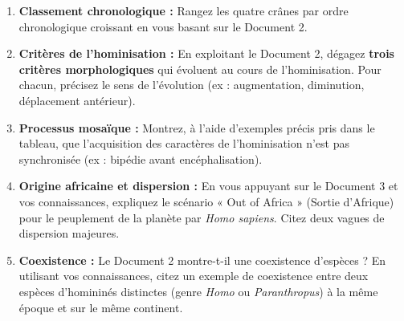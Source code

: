 \documentclass[11pt]{article}
\begin{document}
\begin{exercice}
\begin{enumerate}
    \item \textbf{Classement chronologique :} Rangez les quatre crânes par ordre chronologique croissant en vous basant sur le Document 2.
    \item \textbf{Critères de l'hominisation :} En exploitant le Document 2, dégagez \textbf{trois critères morphologiques} qui évoluent au cours de l'hominisation. Pour chacun, précisez le sens de l'évolution (ex : augmentation, diminution, déplacement antérieur).
    \item \textbf{Processus mosaïque :} Montrez, à l'aide d'exemples précis pris dans le tableau, que l'acquisition des caractères de l'hominisation n'est pas synchronisée (ex : bipédie avant encéphalisation).
    \item \textbf{Origine africaine et dispersion :} En vous appuyant sur le Document 3 et vos connaissances, expliquez le scénario « Out of Africa » (Sortie d'Afrique) pour le peuplement de la planète par \emph{Homo sapiens}. Citez deux vagues de dispersion majeures.
    \item \textbf{Coexistence :} Le Document 2 montre-t-il une coexistence d'espèces ? En utilisant vos connaissances, citez un exemple de coexistence entre deux espèces d'homininés distinctes (genre \emph{Homo} ou \emph{Paranthropus}) à la même époque et sur le même continent.
\end{enumerate}
\end{exercice}
\end{document}
